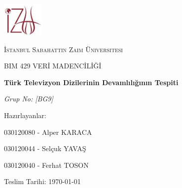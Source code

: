 \begin{titlepage}
	\centering
	\includegraphics[width=0.15\textwidth]{izu_logo.jpg}\par\vspace{1cm}
	{\scshape\LARGE İstanbul Sabahattin Zaim Üniversitesi \par}	
	\vspace{1cm}
	{\scshape\Large BIM 429 VERİ MADENCİLİĞİ \par}
	\vspace{1.5cm}
	{\huge\bfseries Türk Televizyon Dizilerinin Devamlılığının Tespiti \par}
	\vspace{2cm}
	{\Large\itshape Grup No: [BG9] \par}
	\vfill
	Hazırlayanlar:\par
	030120080 - Alper KARACA\par
	030120044 - Selçuk YAVAŞ\par
	030120040 - Ferhat TOSON\par
	
	\vfill
	
	{\large Teslim Tarihi: \today\par}
\end{titlepage}